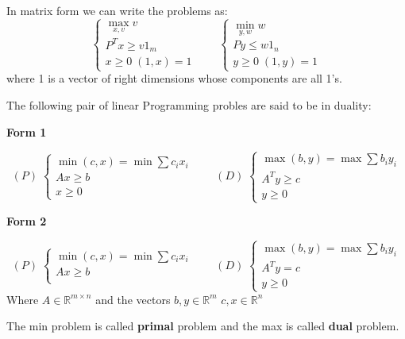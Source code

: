 \documentclass[../main.tex]{subfiles}
\begin{document}
In matrix form we can write the problems as:
\[
    \begin{cases}
        \max_{x,v} v     \\
        P^T x \geq v 1_m \\
        x \geq 0 \; (1,x) = 1
    \end{cases}
    \qquad
    \begin{cases}
        \min_{y,w} w  \\
        Py \leq w 1_n \\
        y \geq 0 \; (1,y) = 1
    \end{cases}
\]
where 1 is a vector of right dimensions whose components are all 1's.
\begin{definition}[Duality]
    The following pair of linear Programming probles are said to be in duality:
    \begin{center}
        \small \textbf{Form 1}
    \end{center}
    \[
        (P) \;
        \begin{cases}
            \min(c,x) = \min \sum c_i x_i \\
            Ax \geq b                     \\
            x \geq 0
        \end{cases}
        \qquad
        (D) \;
        \begin{cases}
            \max(b,y) = \max \sum b_i y_i \\
            A^T y \geq c                  \\
            y \geq 0
        \end{cases}
    \]
    \begin{center}
        \small \textbf{Form 2}
    \end{center}
    \[
        (P) \;
        \begin{cases}
            \min(c,x) = \min \sum c_i x_i \\
            Ax \geq b                     \\
        \end{cases}
        \qquad
        (D) \;
        \begin{cases}
            \max(b,y) = \max \sum b_i y_i \\
            A^T y = c                     \\
            y \geq 0
        \end{cases}
    \]
    Where $A \in \mathbb{R}^{m \times n}$ and the vectors $b,y \in \mathbb{R}^m$ $c,x \in \mathbb{R}^n$
\end{definition}
The min problem is called \textbf{primal} problem and the max is called \textbf{dual} problem.
\end{document}
